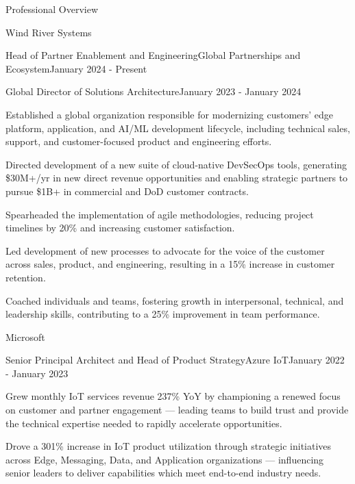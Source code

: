 \documentclass{resume} %
\begin{document}
\begin{rSection}{Professional Overview}
\begin{rCompany}{Wind River Systems}{}{}
\begin{rSubSubsection}{Head of Partner Enablement and Engineering}{Global Partnerships and Ecosystem}{January 2024 - Present}
    \end{rSubSubsection}
    
    \begin{rSubSubsection}{Global Director of Solutions Architecture}{}{January 2023 - January 2024}

      \item Established a global organization responsible for modernizing customers' edge platform, application, and AI/ML development lifecycle, including technical sales, support, and customer-focused product and engineering efforts.
      \item Directed development of a new suite of cloud-native DevSecOps tools, generating \$30M+/yr in new direct revenue opportunities and enabling strategic partners to pursue \$1B+ in commercial and DoD customer contracts.
      \item Spearheaded the implementation of agile methodologies, reducing project timelines by 20\% and increasing customer satisfaction.
      \item Led development of new processes to advocate for the voice of the customer across sales, product, and engineering, resulting in a 15\% increase in customer retention.
      \item Coached individuals and teams, fostering growth in interpersonal, technical, and leadership skills, contributing to a 25\% improvement in team performance.

    \end{rSubSubsection}
  \end{rCompany}

  \begin{rCompany}{Microsoft}{}{}

     \begin{rSubSubsection}{Senior Principal Architect and Head of Product Strategy}{Azure IoT}{January 2022 - January 2023}
        \item Grew monthly IoT services revenue 237\% YoY by championing a renewed focus on customer and partner engagement --- leading teams to build trust and provide the technical expertise needed to rapidly accelerate opportunities.
        \item Drove a 301\% increase in IoT product utilization through strategic initiatives across Edge, Messaging, Data, and Application organizations --- influencing senior leaders to deliver capabilities which meet end-to-end industry needs.


\end{rSubSubsection}
\end{rCompany}
\end{rSection}
\end{document}
